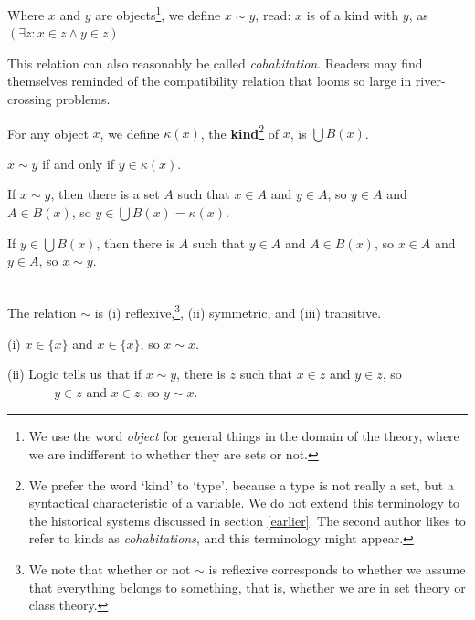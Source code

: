 \documentclass[12pt]{article}
\begin{document}
\begin{dfn}\label{dfn:kind}
Where $x$ and $y$ are objects\footnote{We use the word {\em object\/} for general things in the domain of the theory, where we are indifferent to whether they are sets or not.}, we define $x \sim y$, read: $x$ {\rm is of a
  kind with} $y$, as $(\exists z:x \in z \wedge y \in z)$.\end{dfn}

This relation can also reasonably be called {\em cohabitation\/}.
Readers may find themselves reminded of the compatibility relation that
looms so large in river-crossing problems.

\begin{dfn} For any object $x$, we define $\kappa(x)$, the {\bf kind}\footnote{We prefer the word `kind' to `type', because a type is not really a set, but a syntactical characteristic of a variable.  We do not extend this terminology to the historical systems discussed in section \ref{earlier}.  The second author likes to refer to kinds as {\em cohabitations\/}, and this terminology might appear.} of $x$, is $\bigcup B(x)$.\end{dfn}

\begin{prop}  $x \sim y$ if and only if $y \in \kappa(x)$.\end{prop}

\Proof

If $x \sim y$, then there is a set $A$ such that $x \in A$ and $y \in A$, so $y \in A$ and $A \in B(x)$, so $y \in \bigcup B(x) = \kappa(x)$.

If $y \in \bigcup B(x)$, then there is $A$ such that $y \in A$ and $A \in B(x)$, so $x \in A$ and $y \in A$, so $x \sim y$.

\endproof


\begin{thm}\mbox{\negthinspace}\\
  The relation $\sim$ is (i) reflexive,\footnote{We note that whether or not $\sim$ is reflexive corresponds to whether we assume that everything belongs to something, that is, whether we are in set theory or class theory.}, (ii) symmetric, and (iii)
  transitive.\end{thm}

\Proof

(i) $x \in \{x\}$ and $x \in \{x\}$, so $x \sim x$.

(ii) Logic tells us that if $x \sim y$, there is $z$ such that $x \in z$ and $y \in z$, so\\ \mbox{\, \, \, \, \, } $y \in z$ and $x \in z$, so $y \sim x$.
\end{document}
